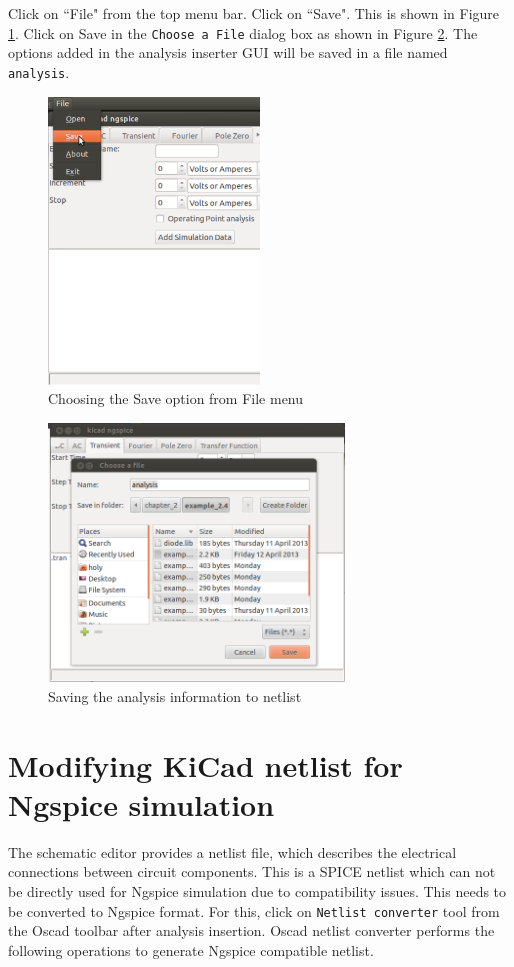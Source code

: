 Click on ``File" from the top menu bar. Click on ``Save". This is shown in Figure \ref{8-file}. Click on Save in the {\tt Choose a File} dialog box as shown in Figure \ref{8-save}. The options added in the analysis inserter GUI will be saved in a file named {\tt analysis}. 
\begin{figure}[t]
\centering
\includegraphics[width=0.5\textwidth]{figures/8-file}
\caption{Choosing the Save option from File menu}
\label{8-file}
\end{figure}

\begin{figure}[t]
\centering
\includegraphics[width=0.7\textwidth]{figures/8-save}
\caption{Saving the analysis information to netlist}
\label{8-save}
\end{figure}
\section{Modifying KiCad netlist for Ngspice simulation} 
The schematic editor provides a netlist file, which describes the electrical connections between circuit components. This is a SPICE netlist  which can not be directly used for Ngspice simulation due to compatibility issues. This needs to be converted to Ngspice format. For this,  click on {\tt Netlist converter} tool from the Oscad toolbar after analysis insertion. Oscad netlist converter performs the following operations to generate Ngspice compatible netlist.
